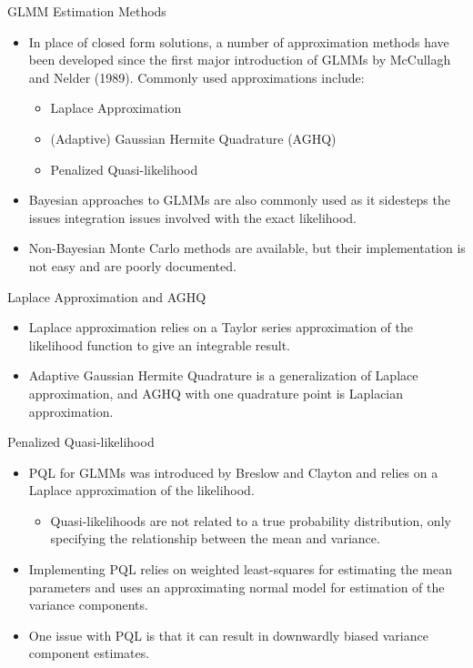 \documentclass{beamer}\usepackage[]{graphicx}\usepackage[]{color}
\begin{document}
\begin{frame}{GLMM Estimation Methods}
	
	\begin{itemize}
		\item In place of closed form solutions, a number of approximation methods have been developed since the first major introduction of GLMMs by McCullagh and Nelder (1989). Commonly used approximations include:
    	\begin{itemize}
    	  \item Laplace Approximation
    		\item (Adaptive) Gaussian Hermite Quadrature (AGHQ)
    		\item Penalized Quasi-likelihood
    	\end{itemize}
		\item Bayesian approaches to GLMMs are also commonly used as it sidesteps the issues integration issues involved with the exact likelihood.
		\item Non-Bayesian Monte Carlo methods are available, but their implementation is not easy and are poorly documented.
	\end{itemize}

\end{frame}

\begin{frame}{Laplace Approximation and AGHQ}
	
	\begin{itemize}
		\item Laplace approximation relies on a Taylor series approximation of the likelihood function to give an integrable result.
		\item Adaptive Gaussian Hermite Quadrature is a generalization of Laplace approximation, and AGHQ with one quadrature point is Laplacian approximation. 
	\end{itemize}

\end{frame}

\begin{frame}{Penalized Quasi-likelihood}
	
	\begin{itemize}
		\item PQL for GLMMs was introduced by Breslow and Clayton and relies on a Laplace approximation of the likelihood.
	  \begin{itemize}
		  \item Quasi-likelihoods are not related to a true probability distribution, only specifying the relationship between the mean and variance.
    \end{itemize}
    \item Implementing PQL relies on weighted least-squares for estimating the mean parameters and uses an approximating normal model for estimation of the variance components.
		\item One issue with PQL is that it can result in downwardly biased variance component estimates. 
	\end{itemize}

\end{frame}
\end{document}
